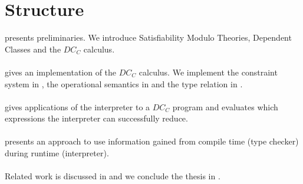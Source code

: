 \section{Structure}
 presents preliminaries.
We introduce Satisfiability Modulo Theories,
Dependent Classes and the $DC_C$ calculus.\\
\\
 gives an implementation of the $DC_C$ calculus.
We implement
the constraint system in ,
the operational semantics in  and
the type relation in .\\
\\
 gives applications of the interpreter
to a $DC_C$ program and
evaluates which expressions the interpreter can successfully reduce.\\
\\
 presents an approach
to use information gained from compile time (type checker)
during runtime (interpreter).\\
\\
Related work is discussed in 
and we conclude the thesis in .

